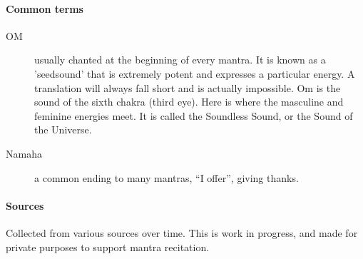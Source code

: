 \begin{intersong}
  \paragraph{Common terms}
  \begin{description}
   \item[OM] usually chanted at the beginning of every mantra. It is known as a 'seedsound' that 
     is extremely potent and expresses a particular energy. A translation will always fall short 
     and is actually impossible. Om is the sound of the sixth chakra (third eye). Here is where 
     the masculine and feminine energies meet. It is called the Soundless Sound, or the Sound of 
     the Universe.
   \item[Namaha] a common ending to many mantras, “I offer”, giving thanks.
  \end{description}

  \paragraph{Sources}

  Collected from various sources over time. This is work in progress, and made for private 
  purposes to support mantra recitation.
\end{intersong}


